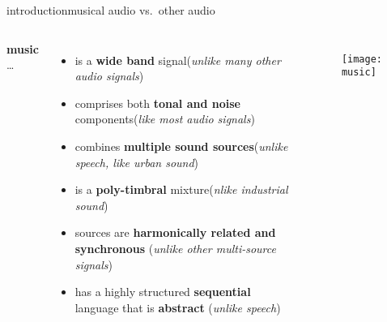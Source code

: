         \begin{frame}{introduction}{musical audio vs.\ other audio}
            \vspace{-3mm}
            \begin{columns}
            \textbf{music} \ldots
            \begin{itemize}
                \item   is a \textbf{wide band} signal(\emph{unlike many other audio signals})
                \item<2->   comprises both \textbf{tonal and noise} components(\emph{like most audio signals})
                \item<3->   combines \textbf{multiple sound sources}(\emph{unlike speech, like urban sound})
                \item<4->   is a \textbf{poly-timbral} mixture(\emph{nlike industrial sound})
                \item<5->  sources are \textbf{harmonically related and synchronous} (\emph{unlike other multi-source signals})
                \item<6->   has a highly structured \textbf{sequential} language that is \textbf{abstract} (\emph{unlike speech})
            \end{itemize}
                \begin{figure}%
                    \texttt{[image: music]}%
                \end{figure}
            \end{columns}
        \end{frame}
        

